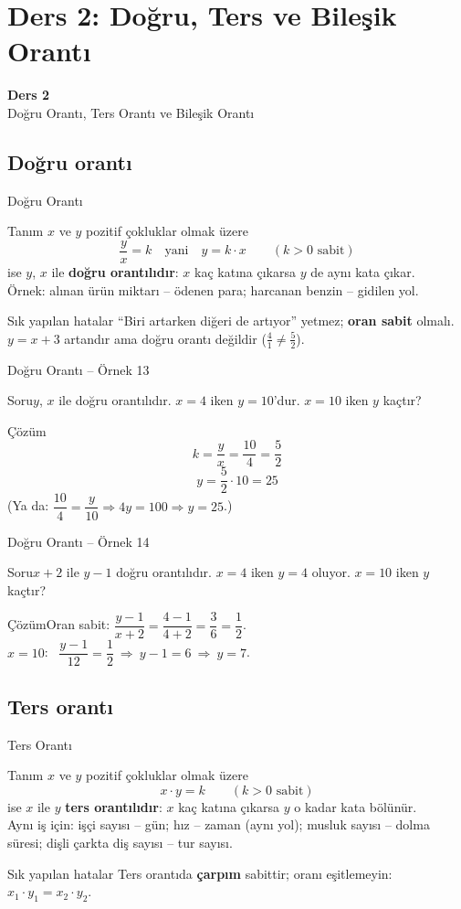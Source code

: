 \documentclass[aspectratio=169,11pt]{beamer}
\newcommand{\soru}[3]{%
\begin{frame}{#1}
  \begin{block}{Soru}\large #2\end{block}
  \pause
  \begin{exampleblock}{Çözüm}\large #3\end{exampleblock}
\end{frame}}
\begin{document}
\section{Ders 2: Doğru, Ters ve Bileşik Orantı}
\begin{frame}
\centering\Large\color{anamavi}\textbf{Ders 2}\\[6pt]\normalsize Doğru Orantı, Ters Orantı ve Bileşik Orantı
\end{frame}

\subsection{Doğru orantı}
\begin{frame}{Doğru Orantı}
\begin{block}{Tanım}
\(x\) ve \(y\) pozitif çokluklar olmak üzere
\[\frac{y}{x}=k\quad\text{yani}\quad y=k\cdot x\qquad(k>0 \text{ sabit})\]
ise \(y\), \(x\) ile \textbf{doğru orantılıdır}: \(x\) kaç katına çıkarsa \(y\) de aynı kata çıkar.\\[2pt]
Örnek: alınan ürün miktarı -- ödenen para; harcanan benzin -- gidilen yol.
\end{block}
\begin{alertblock}{Sık yapılan hatalar}
``Biri artarken diğeri de artıyor'' yetmez; \textbf{oran sabit} olmalı.
\(y=x+3\) artandır ama doğru orantı değildir (\(\frac{4}{1}\neq\frac{5}{2}\)).
\end{alertblock}
\end{frame}

\soru{Doğru Orantı -- Örnek 13}
{\(y\), \(x\) ile doğru orantılıdır. \(x=4\) iken \(y=10\)'dur. \(x=10\) iken \(y\) kaçtır?}
{\[k=\frac{y}{x}=\frac{10}{4}=\frac{5}{2}\]
\[y=\frac{5}{2}\cdot 10=25\]
(Ya da: \(\dfrac{10}{4}=\dfrac{y}{10}\Rightarrow 4y=100\Rightarrow y=25\).)}

\soru{Doğru Orantı -- Örnek 14}
{\(x+2\) ile \(y-1\) doğru orantılıdır. \(x=4\) iken \(y=4\) oluyor. \(x=10\) iken \(y\) kaçtır?}
{Oran sabit: \(\dfrac{y-1}{x+2}=\dfrac{4-1}{4+2}=\dfrac{3}{6}=\dfrac{1}{2}\).\\[3pt]
\(x=10\): \ \(\dfrac{y-1}{12}=\dfrac{1}{2}\ \Rightarrow\ y-1=6\ \Rightarrow\ y=7\).}

\subsection{Ters orantı}
\begin{frame}{Ters Orantı}
\begin{block}{Tanım}
\(x\) ve \(y\) pozitif çokluklar olmak üzere
\[x\cdot y=k\qquad(k>0 \text{ sabit})\]
ise \(x\) ile \(y\) \textbf{ters orantılıdır}: \(x\) kaç katına çıkarsa \(y\) o kadar kata bölünür.\\[2pt]
Aynı iş için: işçi sayısı -- gün; hız -- zaman (aynı yol); musluk sayısı -- dolma süresi; dişli çarkta diş sayısı -- tur sayısı.
\end{block}
\begin{alertblock}{Sık yapılan hatalar}
Ters orantıda \textbf{çarpım} sabittir; oranı eşitlemeyin: \(x_1\cdot y_1=x_2\cdot y_2\).
\end{alertblock}
\end{frame}
\end{document}
